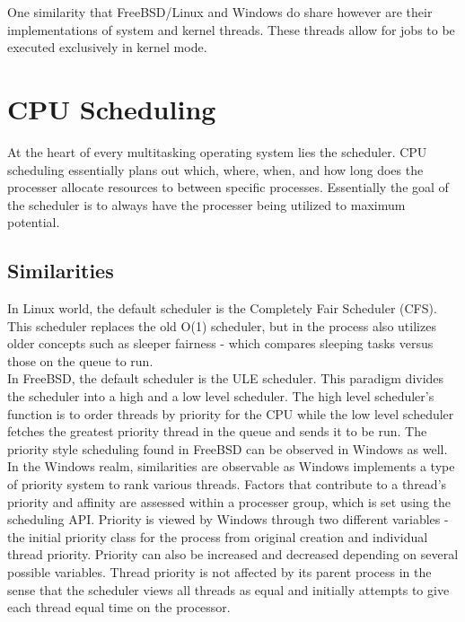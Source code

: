 \documentclass[letterpaper,10pt,titlepage]{article}
\begin{document}
One similarity that FreeBSD/Linux and Windows do share however are their implementations of system and kernel threads.  These threads allow for jobs to be executed exclusively in kernel mode.\\

\section{CPU Scheduling}

At the heart of every multitasking operating system lies the scheduler.  CPU scheduling essentially plans out which, where, when, and how long does the processer allocate resources to between specific processes.  Essentially the goal of the scheduler is to always have the processer being utilized to maximum potential.

\subsection{Similarities}

In Linux world, the default scheduler is the Completely Fair Scheduler (CFS).  This scheduler replaces the old O(1) scheduler, but in the process also utilizes older concepts such as sleeper fairness - which compares sleeping tasks versus those on the queue to run.\\

In FreeBSD, the default scheduler is the ULE scheduler.  This paradigm divides the scheduler into a high and a low level scheduler.  The high level scheduler's function is to order threads by priority for the CPU while the low level scheduler fetches the greatest priority thread in the queue and sends it to be run. The priority style scheduling found in FreeBSD can be observed in Windows as well.\\

In the Windows realm, similarities are observable as Windows implements a type of priority system to rank various threads.  Factors that contribute to a thread's priority and affinity are assessed within a processer group, which is set using the scheduling API.  Priority is viewed by Windows through two different variables - the initial priority class for the process from original creation and individual thread priority.  Priority can also be increased and decreased depending on several possible variables.  Thread priority is not affected by its parent process in the sense that the scheduler views all threads as equal and initially attempts to give each thread equal time on the processor.\\
\end{document}
